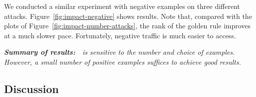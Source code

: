 \documentclass[conference]{IEEEtran}
\begin{document}
We conducted a similar experiment with negative examples on three
different attacks. Figure~\ref{fig:impact-negative} shows
results. Note that, compared with the plots of
Figure~\ref{fig:impact-number-attacks}, the rank of the golden rule
improves at a much slower pace. Fortunately, negative traffic is much
easier to access.



\emph{ \textbf{Summary of results:}~\tname\ is sensitive to the number
  and choice of examples. However, a small number of positive examples
  suffices to achieve good results.}



\subsection{Discussion}
\label{sec:rce}
\label{sec:jboss}
\label{sec:content-example}
\label{sec:dos}
\label{sec:threats}
\end{document}
